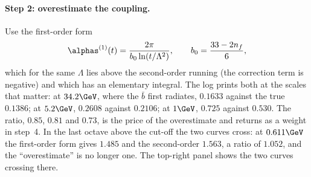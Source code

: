 \paragraph{Step 2: overestimate the coupling.} Use the first-order form
\begin{equation}
  \alphas^{(1)}(t)=\frac{2\pi}{b_0\ln(t/\Lambda^2)},\qquad
  b_0=\frac{33-2n_f}{6},
  \label{eq:mother_gives_birth:alphas_1loop}
\end{equation}
which for the same $\Lambda$ lies above the second-order running (the
correction term is negative) and which has an elementary integral. The
log prints both at the scales that matter: at $34.2\GeV$, where the
$\bar b$ first radiates, $0.1633$ against the true $0.1386$; at $5.2\GeV$,
$0.2608$ against $0.2106$; at $1\GeV$, $0.725$ against $0.530$. The ratio,
$0.85$, $0.81$ and $0.73$, is the price of the overestimate and returns as
a weight in step~4. In the last octave above the cut-off the two curves
cross: at $0.611\GeV$ the first-order form gives $1.485$ and the
second-order $1.563$, a ratio of $1.052$, and the ``overestimate'' is no
longer one. The top-right panel shows the two curves crossing there.

